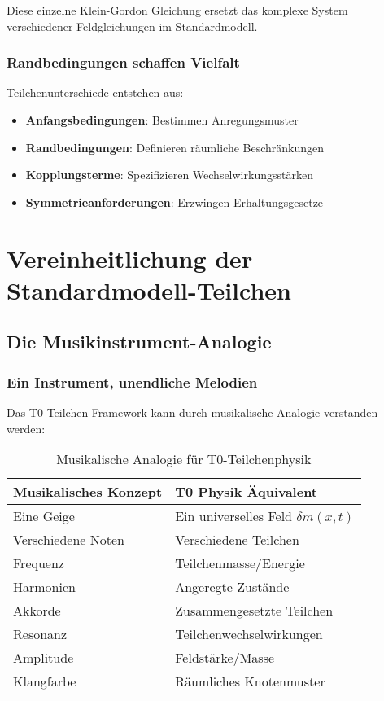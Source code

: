 \documentclass[12pt,a4paper]{article}
\newcommand{\deltafield}{\ensuremath{\delta m}}
\begin{document}
	Diese einzelne Klein-Gordon Gleichung ersetzt das komplexe System verschiedener Feldgleichungen im Standardmodell.
	
	\subsubsection{Randbedingungen schaffen Vielfalt}
	\label{subsubsec:randbedingungen}
	
	Teilchenunterschiede entstehen aus:
	\begin{itemize}
		\item \textbf{Anfangsbedingungen}: Bestimmen Anregungsmuster
		\item \textbf{Randbedingungen}: Definieren räumliche Beschränkungen  
		\item \textbf{Kopplungsterme}: Spezifizieren Wechselwirkungsstärken
		\item \textbf{Symmetrieanforderungen}: Erzwingen Erhaltungsgesetze
	\end{itemize}
	
	\section{Vereinheitlichung der Standardmodell-Teilchen}
	\label{sec:sm_vereinheitlichung}
	
	\subsection{Die Musikinstrument-Analogie}
	\label{subsec:musikinstrument_analogie}
	
	\subsubsection{Ein Instrument, unendliche Melodien}
	\label{subsubsec:ein_instrument}
	
	Das T0-Teilchen-Framework kann durch musikalische Analogie verstanden werden:
	
	\begin{table}[htbp]
		\centering
		\begin{tabular}{ll}
			\toprule
			\textbf{Musikalisches Konzept} & \textbf{T0 Physik Äquivalent} \\
			\midrule
			Eine Geige & Ein universelles Feld $\deltafield(x,t)$ \\
			Verschiedene Noten & Verschiedene Teilchen \\
			Frequenz & Teilchenmasse/Energie \\
			Harmonien & Angeregte Zustände \\
			Akkorde & Zusammengesetzte Teilchen \\
			Resonanz & Teilchenwechselwirkungen \\
			Amplitude & Feldstärke/Masse \\
			Klangfarbe & Räumliches Knotenmuster \\
			\bottomrule
		\end{tabular}
		\caption{Musikalische Analogie für T0-Teilchenphysik}
		\label{tab:musikinstrument_analogie}
	\end{table}
	
\end{document}
